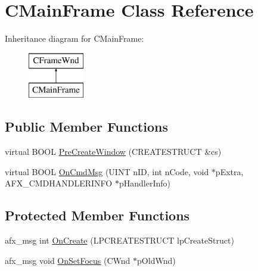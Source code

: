 \hypertarget{class_c_main_frame}{}\section{C\+Main\+Frame Class Reference}
\label{class_c_main_frame}
Inheritance diagram for C\+Main\+Frame\+:\begin{figure}[H]
\begin{center}
\leavevmode
\includegraphics[height=2.000000cm]{class_c_main_frame}
\end{center}
\end{figure}
\subsection*{Public Member Functions}
\begin{DoxyCompactItemize}
\item 
virtual B\+O\+OL \mbox{\hyperlink{class_c_main_frame_a549bf677c955c2898c3c683321633c16}{Pre\+Create\+Window}} (C\+R\+E\+A\+T\+E\+S\+T\+R\+U\+CT \&cs)
\item 
virtual B\+O\+OL \mbox{\hyperlink{class_c_main_frame_ade959eb0bab719bf06bb9b18ee407101}{On\+Cmd\+Msg}} (U\+I\+NT n\+ID, int n\+Code, void $\ast$p\+Extra, A\+F\+X\+\_\+\+C\+M\+D\+H\+A\+N\+D\+L\+E\+R\+I\+N\+FO $\ast$p\+Handler\+Info)
\end{DoxyCompactItemize}
\subsection*{Protected Member Functions}
\begin{DoxyCompactItemize}
\item 
afx\+\_\+msg int \mbox{\hyperlink{class_c_main_frame_a48666466fd37412fcaeff75c3b12e0ed}{On\+Create}} (L\+P\+C\+R\+E\+A\+T\+E\+S\+T\+R\+U\+CT lp\+Create\+Struct)
\item 
afx\+\_\+msg void \mbox{\hyperlink{class_c_main_frame_adc353a3d1fc497fbc009b6d9e6914a82}{On\+Set\+Focus}} (C\+Wnd $\ast$p\+Old\+Wnd)
\end{DoxyCompactItemize}

